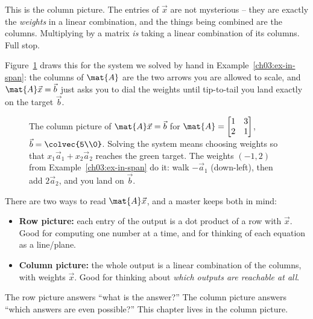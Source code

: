 This is the column picture. The entries of $\vec{x}$ are not mysterious -- they are exactly the \emph{weights} in a linear combination, and the things being combined are the columns. Multiplying by a matrix \emph{is} taking a linear combination of its columns. Full stop.

Figure~\ref{ch03:column-picture} draws this for the system we solved by hand in Example~\ref{ch03:ex-in-span}: the columns of $\mat{A}$ are the two arrows you are allowed to scale, and $\mat{A}\vec{x}=\vec{b}$ just asks you to dial the weights until tip-to-tail you land exactly on the target $\vec{b}$.

\begin{figure}[H]
\centering
{}
\caption{The column picture of $\mat{A}\vec{x}=\vec{b}$ for $\mat{A}=\protect\begin{bmatrix}1&3\\2&1\protect\end{bmatrix}$, $\vec{b}=\colvec{5\\0}$. Solving the system means choosing weights so that $x_1\vec{a}_1+x_2\vec{a}_2$ reaches the green target. The weights $(-1,2)$ from Example~\ref{ch03:ex-in-span} do it: walk $-\vec{a}_1$ (down-left), then add $2\vec{a}_2$, and you land on $\vec{b}$.}
\label{ch03:column-picture}
\end{figure}

\begin{intuitionbox}
There are two ways to read $\mat{A}\vec{x}$, and a master keeps both in mind:
\begin{itemize}
  \item \textbf{Row picture:} each entry of the output is a dot product of a row with $\vec{x}$. Good for computing one number at a time, and for thinking of each equation as a line/plane.
  \item \textbf{Column picture:} the whole output is a linear combination of the columns, with weights $\vec{x}$. Good for thinking about \emph{which outputs are reachable at all}.
\end{itemize}
The row picture answers ``what is the answer?'' The column picture answers ``which answers are even possible?'' This chapter lives in the column picture.
\end{intuitionbox}

